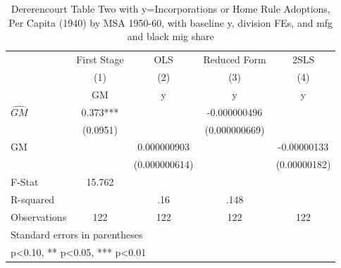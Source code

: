 \begin{table}[htbp]\centering
\def\sym#1{\ifmmode^{#1}\else\(^{#1}\)\fi}
\caption{Dererencourt Table Two with y=Incorporations or Home Rule Adoptions, Per Capita (1940) by MSA 1950-60, with baseline y, division FEs, and mfg and black mig share}
\begin{tabular}{l*{4}{c}}
\toprule
                    & First Stage   &         OLS   &Reduced Form   &        2SLS   \\
                    &\multicolumn{1}{c}{(1)}&\multicolumn{1}{c}{(2)}&\multicolumn{1}{c}{(3)}&\multicolumn{1}{c}{(4)}\\
                    &\multicolumn{1}{c}{GM}&\multicolumn{1}{c}{y}&\multicolumn{1}{c}{y}&\multicolumn{1}{c}{y}\\
\midrule
$\hat{GM}$          &       0.373***&               &-0.000000496   &               \\
                    &    (0.0951)   &               &(0.000000669)   &               \\
\addlinespace
GM                  &               & 0.000000903   &               & -0.00000133   \\
                    &               &(0.000000614)   &               &(0.00000182)   \\
\midrule
F-Stat              &      15.762   &               &               &               \\
R-squared           &               &         .16   &        .148   &               \\
Observations        &         122   &         122   &         122   &         122   \\
\bottomrule
\multicolumn{5}{l}{\footnotesize Standard errors in parentheses}\\
\multicolumn{5}{l}{\footnotesize * p<0.10, ** p<0.05, *** p<0.01}\\
\end{tabular}
\end{table}
